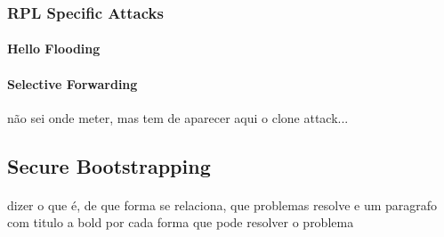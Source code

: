 \paragraph{}

\subsubsection{RPL Specific Attacks}

\paragraph{\textbf{Hello Flooding}}

\paragraph{\textbf{Selective Forwarding}}

não sei onde meter, mas tem de aparecer aqui o clone attack...


\subsection{Secure Bootstrapping}
\paragraph{}
dizer o que é, de que forma se relaciona, que problemas resolve e um paragrafo com titulo a bold por cada forma que pode resolver o problema

